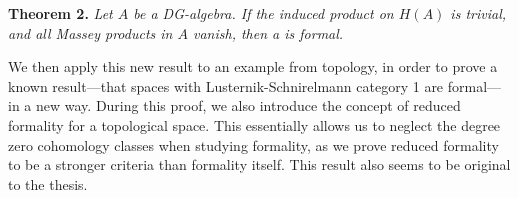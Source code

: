 \textbf{Theorem 2.} \textit{Let $A$ be a DG-algebra. If the induced product on $H(A)$ is trivial, and all Massey products in $A$ vanish, then a is formal.}

We then apply this new result to an example from topology, in order to prove a known result---that spaces with Lusternik-Schnirelmann category 1 are formal---in a new way. During this proof, we also introduce the concept of reduced formality for a topological space. This essentially allows us to neglect the degree zero cohomology classes when studying formality, as we prove reduced formality to be a stronger criteria than formality itself. This result also seems to be original to the thesis. 

 
 






